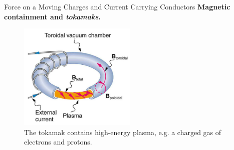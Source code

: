 \documentclass{beamer}
\begin{document}
\begin{frame}{Force on a Moving Charges and Current Carrying Conductors}
\textbf{Magnetic containment and \textit{tokamaks}.}
\begin{figure}
\centering
\includegraphics[width=0.5\textwidth]{figures/tokamak.png}
\caption{\label{fig:tokamak} The tokamak contains high-energy plasma, e.g. a charged gas of electrons and protons.}
\end{figure}
\end{frame}
\end{document}
